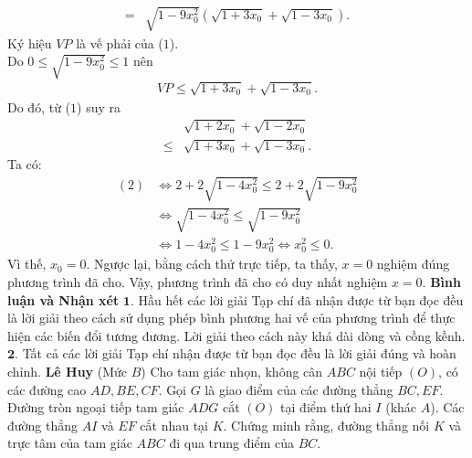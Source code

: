 \begin{multicols}{2}
\begin{align*}
		= &\sqrt {\!1 \!-\! 9x_0^2} \left(\!\sqrt {1 \!+\! 3{x_0}}  \!+\! \sqrt {1 \!-\! 3{x_0}}  \right). \tag{$1$}
	\end{align*}
	Ký hiệu $VP$ là vế phải của ($1$).\\
	Do $0 \le \sqrt {1 - 9x_0^2}  \le 1$  nên
	\begin{align*}
		VP \le \sqrt {1 + 3{x_0}}  + \sqrt {1 - 3{x_0}} .
	\end{align*}
	Do đó, từ ($1$) suy ra
	\begin{align*}
		&\sqrt {1 + 2{x_0}}  + \sqrt {1 - 2{x_0}}  \\
		\le &\sqrt {1 + 3{x_0}}  + \sqrt {1 - 3{x_0}}. \tag{$2$}
	\end{align*}
	Ta có:
	\begin{align*}
		(2) &\Leftrightarrow 2 + 2\sqrt {1 - 4x_0^2}  \le 2 + 2\sqrt {1 - 9x_0^2} \\
		&\Leftrightarrow \sqrt {1 - 4x_0^2}  \le \sqrt {1 - 9x_0^2} \\
		&\Leftrightarrow 1 - 4x_0^2 \le 1 - 9x_0^2 \Leftrightarrow x_0^2 \le 0.
	\end{align*}  
	Vì thế,  $x_0 = 0$.
	\vskip 0.05cm
	Ngược lại, bằng cách thử trực tiếp, ta thấy, $x = 0$ nghiệm đúng phương trình đã cho.
	\vskip 0.05cm
	Vậy, phương trình đã cho có duy nhất nghiệm $x = 0$.
	\vskip 0.05cm
	\textbf{\color{thachthuctoanhoc}Bình luận và Nhận xét}
	\vskip 0.05cm
	$\pmb{1.}$ Hầu hết các lời giải Tạp chí đã nhận được từ bạn đọc đều là lời giải theo cách sử dụng phép bình phương hai vế của phương trình để thực hiện các biến đổi tương đương. Lời giải theo cách này khá dài dòng và cồng kềnh.
	\vskip 0.05cm
	$\pmb{2.}$ Tất cả các lời giải Tạp chí nhận được từ bạn đọc đều là lời giải đúng và hoàn chỉnh.
	\vskip 0.05cm
	\hfill	\textbf{\color{thachthuctoanhoc}Lê Huy}
	\vskip 0.05cm
	{}
	(Mức $B$) Cho tam giác nhọn, không cân $ABC$ nội tiếp $(O)$, có các đường cao $AD,BE,CF$. Gọi $G$ là giao điểm của các đường thẳng $BC,EF$. Đường tròn ngoại tiếp tam giác  $ADG$ cắt $(O)$ tại điểm thứ hai $I$ (khác  $A$). Các đường thẳng $AI$ và $EF$ cắt nhau tại $K$. Chứng minh rằng, đường thẳng nối $K$ và trực tâm của tam giác $ABC$  đi qua trung điểm của $BC$.
	\begin{figure}[H]
		\vspace*{-5pt}
		\centering
		\captionsetup{labelformat= empty, justification=centering}

\end{figure}
\end{multicols}
